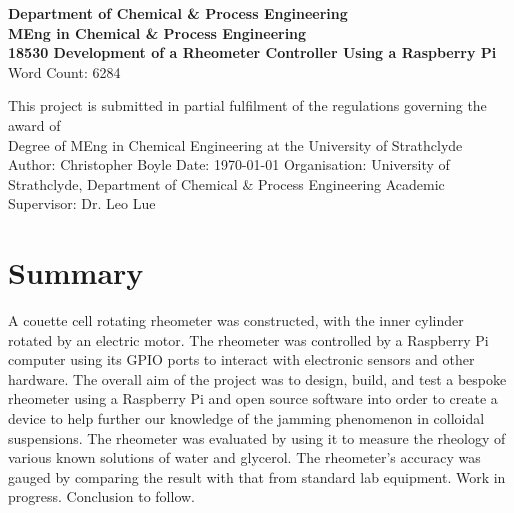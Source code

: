 \documentclass[twoside,a4]{report}
\def\atitle{Development of a Rheometer Controller Using a Raspberry Pi}
\def\shorttitle{Development of a Rheometer Controller}
\def\thewords{6284} %
\def\br{\newline \newline \noindent}
\def\achapter{\shorttitle}  %
\def\jc#1{
	\def\achapter{#1}
	\addcontentsline{toc}{chapter}{\achapter} 
	\chapter*{\achapter} 
}
\begin{document}
	\begin{titlepage}
		\centering
		\vskip3cm
		{
			\bfseries\Large
			Department of Chemical \& Process Engineering\\
			\vskip1cm
			MEng in Chemical \& Process Engineering\\
			18530
			\vskip3cm
			\LARGE\atitle
		}
		\vskip3cm
		{\small Word Count: \thewords}
		\vskip1cm
		\begin{flushleft}
			This project is submitted in partial fulfilment of the regulations governing the award of \\
			Degree of MEng in Chemical Engineering at the University of Strathclyde
			\vskip2cm
			Author: Christopher Boyle \hfill Date: \today \newline
			\vskip1cm
			Organisation: University of Strathclyde, Department of Chemical \& Process Engineering \newline
			Academic Supervisor: Dr. Leo Lue
		\end{flushleft}
	\end{titlepage}

	\setcounter{page}{0}
	\begin{center}\newpage \end{center}
	
	\jc{Summary} %
	A couette cell rotating rheometer was constructed, with the inner cylinder rotated by an electric motor. The rheometer was controlled by a Raspberry Pi computer using its GPIO ports to interact with electronic sensors and other hardware. \br
	The overall aim of the project was to design, build, and test a bespoke rheometer using a Raspberry Pi and open source software into order to create a device to help further our knowledge of the jamming phenomenon in colloidal suspensions.\br
	The rheometer was evaluated by using it to measure the rheology of various known solutions of water and glycerol. The rheometer's accuracy was gauged by comparing the result with that from standard lab equipment. \br
	Work in progress. Conclusion to follow.
	\newpage \begin{center} \large \space \normalsize \end{center}
	
\end{document}
